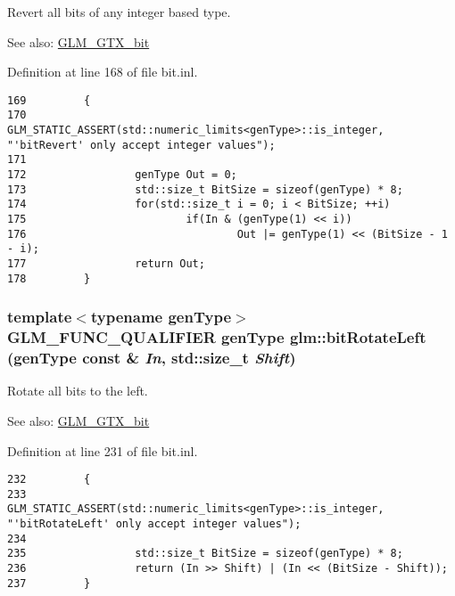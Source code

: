 Revert all bits of any integer based type. \begin{Desc}
\item[See also:]\hyperlink{group__gtx__bit}{GLM\_\-GTX\_\-bit} \end{Desc}


Definition at line 168 of file bit.inl.

\begin{Code}\begin{verbatim}169         {
170                 GLM_STATIC_ASSERT(std::numeric_limits<genType>::is_integer, "'bitRevert' only accept integer values");
171 
172                 genType Out = 0;
173                 std::size_t BitSize = sizeof(genType) * 8;
174                 for(std::size_t i = 0; i < BitSize; ++i)
175                         if(In & (genType(1) << i))
176                                 Out |= genType(1) << (BitSize - 1 - i);
177                 return Out;
178         }
\end{verbatim}
\end{Code}


\hypertarget{group__gtx__bit_g4cd980832ab9c35c73f8c76b8f309c92}{
\subsubsection[bitRotateLeft]{\setlength{\rightskip}{0pt plus 5cm}template$<$typename genType$>$ GLM\_\-FUNC\_\-QUALIFIER genType glm::bitRotateLeft (genType const \& {\em In}, \/  std::size\_\-t {\em Shift})}}
\label{group__gtx__bit_g4cd980832ab9c35c73f8c76b8f309c92}


Rotate all bits to the left. \begin{Desc}
\item[See also:]\hyperlink{group__gtx__bit}{GLM\_\-GTX\_\-bit} \end{Desc}


Definition at line 231 of file bit.inl.

\begin{Code}\begin{verbatim}232         {
233                 GLM_STATIC_ASSERT(std::numeric_limits<genType>::is_integer, "'bitRotateLeft' only accept integer values");
234 
235                 std::size_t BitSize = sizeof(genType) * 8;
236                 return (In >> Shift) | (In << (BitSize - Shift));
237         }
\end{verbatim}
\end{Code}


